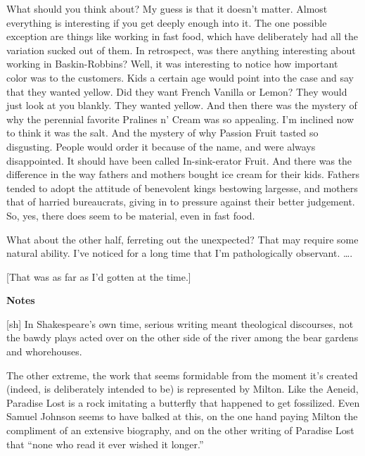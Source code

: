 What should you think about? My guess is that it doesn't matter. Almost
everything is interesting if you get deeply enough into it. The one
possible exception are things like working in fast food, which have
deliberately had all the variation sucked out of them. In retrospect,
was there anything interesting about working in Baskin-Robbins? Well, it
was interesting to notice how important color was to the customers. Kids
a certain age would point into the case and say that they wanted yellow.
Did they want French Vanilla or Lemon? They would just look at you
blankly. They wanted yellow. And then there was the mystery of why the
perennial favorite Pralines n' Cream was so appealing. I'm inclined now
to think it was the salt. And the mystery of why Passion Fruit tasted so
disgusting. People would order it because of the name, and were always
disappointed. It should have been called In-sink-erator Fruit. And there
was the difference in the way fathers and mothers bought ice cream for
their kids. Fathers tended to adopt the attitude of benevolent kings
bestowing largesse, and mothers that of harried bureaucrats, giving in
to pressure against their better judgement. So, yes, there does seem to
be material, even in fast food.

What about the other half, ferreting out the unexpected? That may
require some natural ability. I've noticed for a long time that I'm
pathologically observant. \ldots.

{[}That was as far as I'd gotten at the time.{]}

\textbf{Notes}

{[}sh{]} In Shakespeare's own time, serious writing meant theological
discourses, not the bawdy plays acted over on the other side of the
river among the bear gardens and whorehouses.

The other extreme, the work that seems formidable from the moment it's
created (indeed, is deliberately intended to be) is represented by
Milton. Like the Aeneid, Paradise Lost is a rock imitating a butterfly
that happened to get fossilized. Even Samuel Johnson seems to have
balked at this, on the one hand paying Milton the compliment of an
extensive biography, and on the other writing of Paradise Lost that
``none who read it ever wished it longer.''
